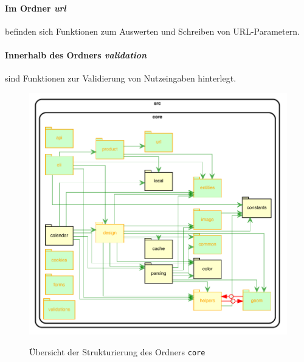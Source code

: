 \paragraph{Im Ordner \emph{url}} befinden sich Funktionen zum Auswerten und Schreiben von URL-Parametern.

\paragraph{Innerhalb des Ordners \emph{validation}} sind Funktionen zur Validierung von Nutzeingaben hinterlegt.

\begin{figure}[H]
    \centering
    \caption{Übersicht der Strukturierung des Ordners \lstinline|core|}
    \includegraphics[width=.7\textwidth]{diagrams/Ist-Architektur/core-graph.pdf}
    \label{fig:core-sturktur}
\end{figure}





